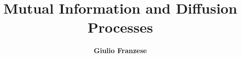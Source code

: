 
\title{Mutual Information and Diffusion Processes}
\author{\textbf{Giulio Franzese}\\ } %

\date{}
